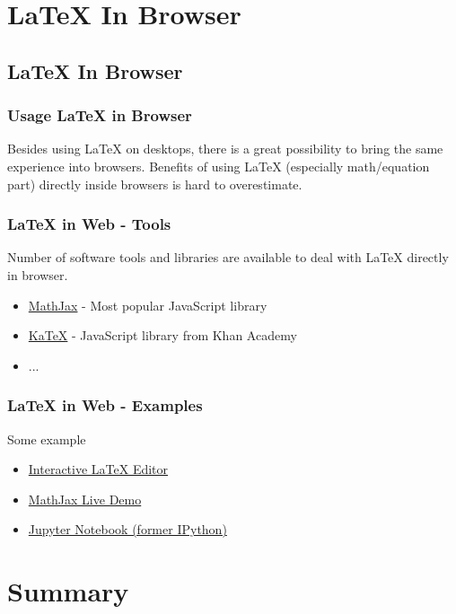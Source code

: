 \documentclass[slidestop,compress,mathserif]{beamer}
\begin{document}
\section[LaTeX In Browser]{LaTeX In Browser}
\subsection{LaTeX In Browser}
	
	\begin{frame} \frametitle{Usage LaTeX in Browser}
		Besides using LaTeX on desktops, there is a great possibility to bring the same experience into browsers. Benefits of using LaTeX (especially math/equation part) directly inside browsers is hard to overestimate.
	\end{frame}
	
	\begin{frame} \frametitle{LaTeX in Web - Tools}
		Number of software tools and libraries are available to deal with LaTeX directly in browser.\\
		
		\begin{itemize}
			\item \href{https://www.mathjax.org/}{MathJax} - Most popular JavaScript library
			\item \href{https://khan.github.io/KaTeX/}{KaTeX} - JavaScript library from Khan Academy
			\item ...
		\end{itemize}
	
	\end{frame}
	
		\begin{frame} \frametitle{LaTeX in Web - Examples}
			Some example\\
			
			\begin{itemize}
				\item \href{http://arachnoid.com/latex/}{Interactive LaTeX Editor}
				\item \href{https://github.com/mathjax/MathJax/blob/master/test/sample-dynamic-2.html}{MathJax Live Demo}
				\item \href{https://ipython.org/ipython-doc/3/install/install.html\#mathjax}{Jupyter Notebook (former IPython)}
			\end{itemize}
			
		\end{frame}

\section[Summary]{Summary}
\end{document}
